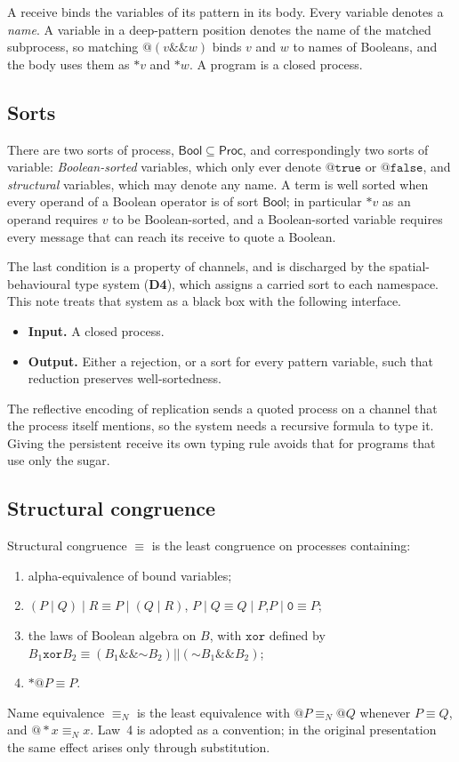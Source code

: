 \documentclass[11pt]{article}
\makeatletter
\newcommand{\kw}[1]{\texttt{#1}}
\newcommand{\nil}{\kw{0}}
\newcommand{\tru}{\kw{true}}
\newcommand{\fls}{\kw{false}}
\newcommand{\bnot}{\mathord{\sim}}
\newcommand{\band}{\mathbin{\&\&}}
\newcommand{\bor}{\mathbin{||}}
\newcommand{\bxor}{\mathbin{\kw{xor}}}
\newcommand{\quo}[1]{@#1}
\newcommand{\drp}[1]{{*}#1}
\newcommand{\cpar}{\mathbin{|}}
\newcommand{\scong}{\equiv}
\newcommand{\nameq}{\equiv_N}
\newcommand{\dec}[1]{\textbf{D#1}}
\theoremstyle{definition}
\theoremstyle{remark}
\makeatother
\begin{document}
A receive binds the variables of its pattern in its body. Every variable
denotes a \emph{name}. A variable in a deep-pattern position denotes the name
of the matched subprocess, so matching $\quo{(v \band w)}$ binds $v$ and $w$
to names of Booleans, and the body uses them as $\drp{v}$ and $\drp{w}$.
A program is a closed process.

\subsection{Sorts}\label{sec:sorts}

There are two sorts of process, $\mathsf{Bool} \subseteq \mathsf{Proc}$, and
correspondingly two sorts of variable: \emph{Boolean-sorted} variables, which
only ever denote $\quo{\tru}$ or $\quo{\fls}$, and \emph{structural}
variables, which may denote any name. A term is well sorted when every
operand of a Boolean operator is of sort $\mathsf{Bool}$; in particular
$\drp{v}$ as an operand requires $v$ to be Boolean-sorted, and a
Boolean-sorted variable requires every message that can reach its receive to
quote a Boolean.

The last condition is a property of channels, and is discharged by the
spatial-behavioural type system (\dec{4}), which assigns a carried sort to
each namespace. This note treats that system as a black box with the
following interface.
\begin{itemize}
\item \textbf{Input.} A closed process.
\item \textbf{Output.} Either a rejection, or a sort for every pattern
variable, such that reduction preserves well-sortedness.
\end{itemize}
The reflective encoding of replication sends a quoted process on a channel
that the process itself mentions, so the system needs a recursive formula to
type it. Giving the persistent receive its own typing rule avoids that for
programs that use only the sugar.

\subsection{Structural congruence}\label{sec:cong}

Structural congruence $\scong$ is the least congruence on processes
containing:
\begin{enumerate}
\item alpha-equivalence of bound variables;
\item $(P \cpar Q) \cpar R \scong P \cpar (Q \cpar R)$,\quad
      $P \cpar Q \scong Q \cpar P$,\quad $P \cpar \nil \scong P$;
\item the laws of Boolean algebra on $B$, with $\bxor$ defined by
      $B_1 \bxor B_2 \scong (B_1 \band \bnot B_2) \bor (\bnot B_1 \band B_2)$;
\item $\drp{\quo{P}} \scong P$.
\end{enumerate}
Name equivalence $\nameq$ is the least equivalence with
$\quo{P} \nameq \quo{Q}$ whenever $P \scong Q$, and $\quo{\drp{x}} \nameq x$.
Law~4 is adopted as a convention; in the original presentation the same
effect arises only through substitution.
\end{document}
